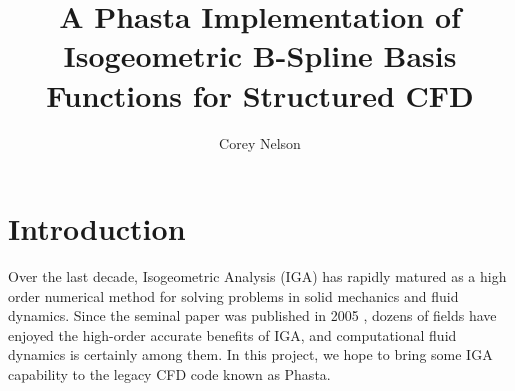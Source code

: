\documentclass[preprint,1p,12pt]{elsarticle}
\begin{document}
\begin{frontmatter}



\title{A Phasta Implementation of Isogeometric B-Spline Basis Functions for Structured CFD}


\author{Corey Nelson}





\end{frontmatter}


\section{Introduction}
Over the last decade, Isogeometric Analysis (IGA) has rapidly matured as a high order numerical method for solving problems in solid mechanics and fluid dynamics. Since the seminal paper was published in 2005 \cite{hughes_isogeometric_2005}, dozens of fields have enjoyed the high-order accurate benefits of IGA, and computational fluid dynamics is certainly among them. In this project, we hope to bring some IGA capability to the legacy CFD code known as Phasta. 
\end{document}
